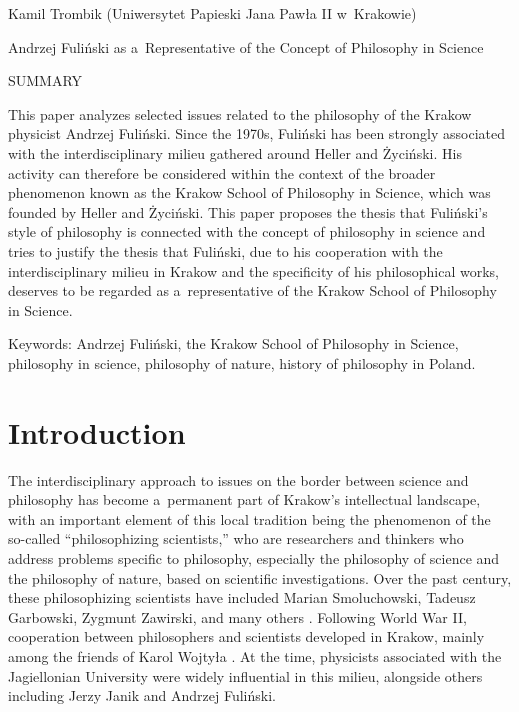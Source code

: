 \setcounter{secnumdepth}{0}







Kamil Trombik (Uniwersytet Papieski Jana Pawła II w~Krakowie)



Andrzej Fuliński as a~Representative of the Concept of Philosophy in Science





SUMMARY



This paper analyzes selected issues related to the philosophy of the Krakow physicist Andrzej Fuliński. Since the 1970s, Fuliński has been strongly associated with the interdisciplinary milieu gathered around Heller and Życiński. His activity can therefore be considered within the context of the broader phenomenon known as the Krakow School of Philosophy in Science, which was founded by Heller and Życiński. This paper proposes the thesis that Fuliński's style of philosophy is connected with the concept of philosophy in science and tries to justify the thesis that Fuliński, due to his cooperation with the interdisciplinary milieu in Krakow and the specificity of his philosophical works, deserves to be regarded as a~representative of the Krakow School of Philosophy in Science.



Keywords: Andrzej Fuliński, the Krakow School of Philosophy in Science, philosophy in science, philosophy of nature, history of philosophy in Poland.



\section{Introduction}

The interdisciplinary approach to issues on the border between science and philosophy has become a~permanent part of Krakow's intellectual landscape, with an important element of this local tradition being the phenomenon of the so-called ``philosophizing scientists,'' who are researchers and thinkers who address problems specific to philosophy, especially the philosophy of science and the philosophy of nature, based on scientific investigations. Over the past century, these philosophizing scientists have included Marian Smoluchowski, Tadeusz Garbowski, Zygmunt Zawirski, and many others 
\parencites[sefor exampl][]{heller_krakowska_2007}[][]{polak_u_2011}[][]{polak_19th_2011}[][]{polak_tradycja_2018}. %
 Following World War II, cooperation between philosophers and scientists developed in Krakow, mainly among the friends of Karol Wojtyła 
\parencites[][]{heller_poczatki_2006}[][]{trombik_koncepcje_2021}[][]{trombik_stworzyc_2022}. %
 At the time, physicists associated with the Jagiellonian University were widely influential in this milieu, alongside others including Jerzy Janik and Andrzej Fuliński.



